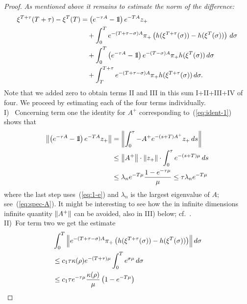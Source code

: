 \documentclass{article}
\begin{document}
\begin{proof}
{\it As mentioned above it remains to estimate the norm of the difference:}
\begin{equation*}
\begin{split}
     \xi^{T+\tau}(T+\tau)-\xi^T(T)
    &=\left(e^{-\tau A}-\1\right) e^{-T A}z_+
  \\
    &\quad
     +\int_0^T e^{-(T+\tau-\sigma)A}\pi_+
     \left(
     h(\xi^{T+\tau}(\sigma))-h(\xi^T(\sigma))
     \right)
     \, d\sigma
  \\
    &\quad
     +\int_0^T
     \left(e^{-\tau A}-\1\right)
     e^{-(T-\sigma)A}\pi_+ h(\xi^T(\sigma))
     \, d\sigma
   \\
    &\quad
     +\int_T^{T+\tau}
     e^{-(T+\tau-\sigma)A}\pi_+
     h(\xi^{T+\tau}(\sigma))
     \, d\sigma.
\end{split}
\end{equation*}
Note that we added zero to obtain terms II and III in this sum I+II+III+IV of four.
We proceed by estimating each of the four terms individually.
\\
I)~ Concerning term one the identity for $A^+$ corresponding to~(\ref{eq:ident-1}) shows that
\begin{equation*}
\begin{split}
     \Norm{\left(e^{-\tau A}-\1\right) e^{-TA}z_+}
    &=\Norm{\int_0^\tau -A^+ e^{-(s+T)A^+} z_+ \, ds}
   \\
    &\le\Norm{A^+}\cdot\Norm{z_+}\cdot\int_0^\tau e^{-(s+T)\mu}\, ds
   \\
    &\le\lambda_n e^{-T\mu}\frac{1-e^{-\tau\mu}}{\mu}
     \le\tau\lambda_n e^{-T\mu}
\end{split}
\end{equation*}
where the last step uses~(\ref{eq:1-e}) and $\lambda_n$ is the
largest eigenvalue of $A$; see~(\ref{eq:spec-A}). It might be interesting
to see how the in infinite dimensions infinite quantity $\mathopen\|A^+\mathclose\|$
can be avoided, also in III) below; cf.~\cite[p.~954]{weber:2014a}.
\\
II)~For term two we get the estimate
\begin{equation*}
\begin{split}
    &\int_0^T\Norm{e^{-(T+\tau-\sigma)A}\pi_+\left(h(\xi^{T+\tau}(\sigma))-h(\xi^T(\sigma))\right)} d\sigma
   \\
    &\le {c_1}\tau\kappa(\rho) e^{-(T+\tau)\mu}
     \int_0^T e^{\sigma\mu}\, d\sigma
   \\
    &\le {c_1}\tau e^{-\tau\mu} \frac{\kappa(\rho)}{\mu} \left(1-e^{-T\mu}\right)

\end{split}
\end{equation*}
\end{proof}
\end{document}
